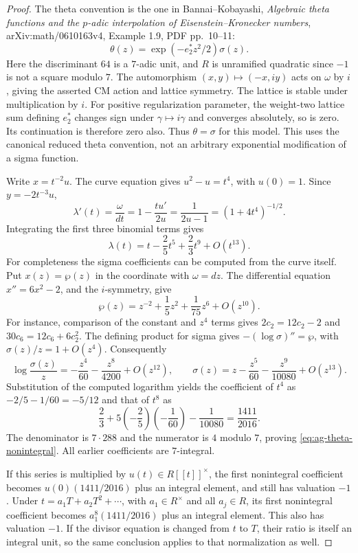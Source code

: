 \begin{proof}
The theta convention is the one in Bannai--Kobayashi,
\emph{Algebraic theta functions and the $p$-adic interpolation
of Eisenstein--Kronecker numbers}, arXiv:math/0610163v4,
Example 1.9, PDF pp.~10--11:
\[
 \theta(z)=\exp(-e_2^*z^2/2)\sigma(z).
\]
Here the discriminant $64$ is a $7$-adic unit, and $R$ is
unramified quadratic since $-1$ is not a square modulo $7$.
The automorphism $(x,y)\mapsto(-x,iy)$ acts on $\omega$ by
$i$, giving the asserted CM action and lattice symmetry.
The lattice is stable under multiplication by $i$.
For positive regularization parameter, the weight-two lattice
sum defining $e_2^*$ changes sign under $\gamma\mapsto i\gamma$
and converges absolutely, so is zero. Its continuation is
therefore zero also. Thus $\theta=\sigma$ for this model.
This uses the canonical reduced theta convention, not an
arbitrary exponential modification of a sigma function.

Write $x=t^{-2}u$. The curve equation gives
$u^2-u=t^4$, with $u(0)=1$. Since $y=-2t^{-3}u$,
\[
 \lambda'(t)=\frac{\omega}{dt}
       =1-\frac{tu'}{2u}
       =\frac1{2u-1}
       =(1+4t^4)^{-1/2}.
\]
Integrating the first three binomial terms gives
\[
 \lambda(t)=t-\frac25t^5+\frac23t^9+O(t^{13}).
\]
For completeness the sigma coefficients can be computed from
the curve itself. Put $x(z)=\wp(z)$ in the coordinate with
$\omega=dz$. The differential equation
$x''=6x^2-2$, and the $i$-symmetry, give
\[
 \wp(z)=z^{-2}+\frac15z^2+\frac1{75}z^6+O(z^{10}).
\]
For instance, comparison of the constant and $z^4$ terms
gives $2c_2=12c_2-2$ and
$30c_6=12c_6+6c_2^2$. The defining product for sigma gives
$-(\log\sigma)''=\wp$, with
$\sigma(z)/z=1+O(z^4)$. Consequently
\[
 \log\frac{\sigma(z)}z
      =-\frac{z^4}{60}-\frac{z^8}{4200}+O(z^{12}),
 \qquad
 \sigma(z)=z-\frac{z^5}{60}-\frac{z^9}{10080}+O(z^{13}).
\]
Substitution of the computed logarithm yields the coefficient
of $t^4$ as $-2/5-1/60=-5/12$ and that of $t^8$ as
\[
 \frac23+5\left(-\frac25\right)\left(-\frac1{60}\right)
           -\frac1{10080}=\frac{1411}{2016}.
\]
The denominator is $7\cdot288$ and the numerator is $4$
modulo $7$, proving \eqref{eq:ag-theta-nonintegral}.
All earlier coefficients are $7$-integral.

If this series is multiplied by $u(t)\in R[[t]]^\times$,
the first nonintegral coefficient becomes
$u(0)(1411/2016)$ plus an integral element, and still has
valuation $-1$. Under $t=a_1T+a_2T^2+\cdots$, with
$a_1\in R^\times$ and all $a_j\in R$, its first
nonintegral coefficient becomes
$a_1^8(1411/2016)$ plus an integral element. This also has
valuation $-1$. If the divisor equation is changed from $t$
to $T$, their ratio is itself an integral unit, so the same
conclusion applies to that normalization as well.
\end{proof}

